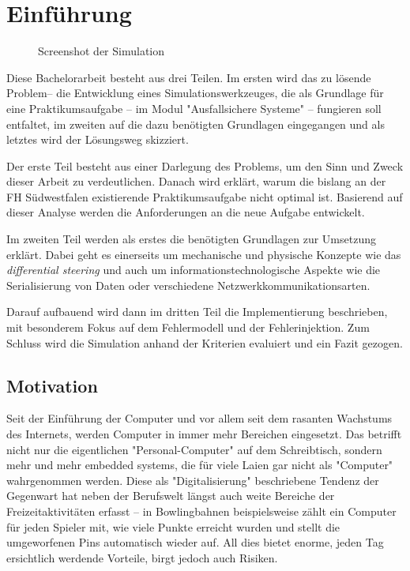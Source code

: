 \clearpage
\section{Einf{\"{u}}hrung}
\begin{figure}
	\centering
	\caption{Screenshot der Simulation}
	\label{fig:simulation}
\end{figure}

Diese Bachelorarbeit besteht aus drei Teilen. Im ersten wird das zu l{\"{o}}sende Problem-- die Entwicklung eines
Simulationswerkzeuges, die als Grundlage f{\"{u}}r eine Praktikumsaufgabe -- im Modul "Ausfallsichere Systeme" --
fungieren soll entfaltet, im zweiten auf die dazu ben{\"{o}}tigten Grundlagen eingegangen und als letztes wird der
L{\"{o}}sungsweg skizziert. 

Der erste Teil besteht aus einer Darlegung des Problems, um den Sinn und Zweck dieser Arbeit zu verdeutlichen. 
Danach wird erkl{\"{a}}rt, warum die bislang an der FH S{\"{u}}dwestfalen existierende Praktikumsaufgabe nicht optimal ist.
Basierend auf dieser Analyse werden die Anforderungen an die neue Aufgabe entwickelt. 

Im zweiten Teil werden als erstes die ben{\"{o}}tigten Grundlagen zur Umsetzung erkl{\"{a}}rt. Dabei geht es einerseits um 
mechanische und physische Konzepte wie das \textit{differential steering} und auch um informationstechnologische Aspekte
wie die Serialisierung von Daten oder verschiedene Netzwerkkommunikationsarten.

Darauf aufbauend wird dann im dritten Teil die Implementierung beschrieben, mit besonderem Fokus auf dem 
Fehlermodell und der Fehlerinjektion. Zum Schluss wird die Simulation anhand der Kriterien evaluiert und ein Fazit 
gezogen.

\subsection{Motivation}
Seit der Einf{\"{u}}hrung der Computer und vor allem seit dem rasanten Wachstums des Internets, werden Computer in immer 
mehr Bereichen eingesetzt. Das betrifft nicht nur die eigentlichen "Personal-Computer" auf dem Schreibtisch, 
sondern mehr und mehr embedded systems, die f{\"{u}}r viele Laien gar nicht als "Computer" wahrgenommen werden. Diese 
als "Digitalisierung" beschriebene Tendenz der Gegenwart hat neben der Berufswelt l{\"{a}}ngst auch weite Bereiche 
der Freizeitaktivit{\"{a}}ten erfasst -- in Bowlingbahnen beispielsweise z{\"{a}}hlt ein Computer f{\"{u}}r jeden 
Spieler mit, wie viele Punkte erreicht wurden und stellt die umgeworfenen Pins automatisch wieder auf. All dies 
bietet enorme, jeden Tag ersichtlich werdende Vorteile, birgt jedoch auch Risiken. 

